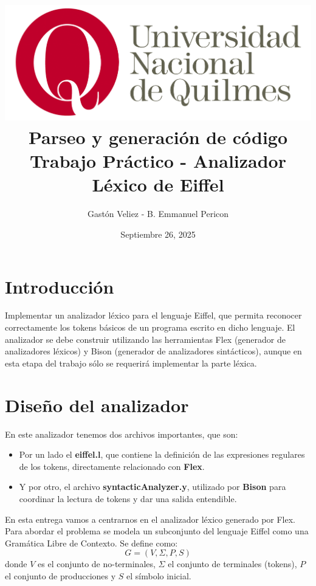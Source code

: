 \documentclass[a4paper,12pt]{article}
\title{
    \includegraphics[scale=1.3]{logo-UNQ}\\
    \vspace{4mm}
    \huge{Parseo y generación de código  \\
        \vspace{4mm}
        Trabajo Práctico - Analizador Léxico de Eiffel} }
\author{Gastón Veliez - B. Emmanuel Pericon}
\date{Septiembre 26, 2025}
\begin{document}
\maketitle

\tableofcontents

\newpage

\section{Introducción}

\vspace{4mm}
Implementar un analizador léxico para el lenguaje Eiffel, que permita reconocer
correctamente los tokens básicos de un programa escrito en dicho lenguaje.
El analizador se debe construir utilizando las herramientas Flex (generador de
analizadores
léxicos) y Bison (generador de analizadores sintácticos), aunque en esta etapa
del trabajo
sólo se requerirá implementar la parte léxica.

\vspace{6mm}
\section{Diseño del analizador}
\vspace{4mm}

En este analizador tenemos dos archivos importantes, que son:

\begin{itemize}
    \item Por un lado el \textbf{eiffel.l}, que contiene la definición de
          las
          expresiones regulares de los tokens, directamente relacionado con
          \textbf{Flex}.
    \item Y por otro, el archivo \textbf{syntacticAnalyzer.y}, utilizado
          por
          \textbf{Bison} para coordinar la lectura de tokens y dar una
          salida entendible.
\end{itemize}

\noindent
En esta entrega vamos a centrarnos en el analizador léxico generado por Flex. \\

\noindent
Para abordar el problema se modela un subconjunto del lenguaje Eiffel como una
Gramática Libre de Contexto. Se define como:
\[
    G = (V, \Sigma, P, S)
\]
donde $V$ es el conjunto de no-terminales, $\Sigma$ el conjunto de terminales
(tokens), $P$ el conjunto de producciones y $S$ el símbolo inicial.
\end{document}
